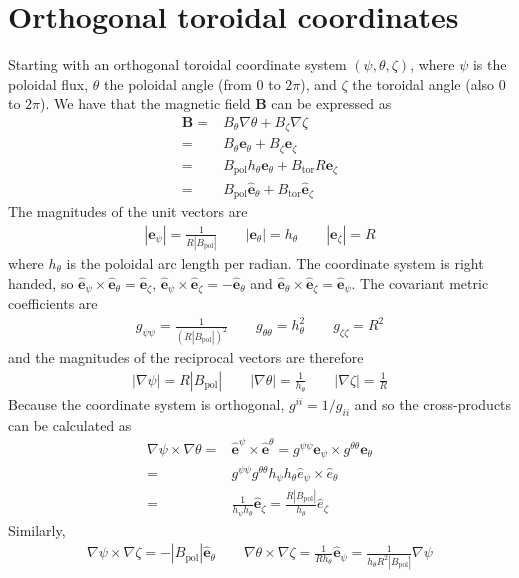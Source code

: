 \documentclass[12pt]{article}
\newcommand{\hthe}{\ensuremath{h_\theta}}
\newcommand{\Bp}{\ensuremath{B_{\text{pol}}}}
\newcommand{\Bt}{\ensuremath{B_{\text{tor}}}}
\newcommand{\ve}[1]{\ensuremath{\boldsymbol{#1}}}
\newcommand{\hv}[1]{\hat{\ve{#1}}}
\newcommand{\Bvec}{\ve{B}}
\begin{document}
\section{Orthogonal toroidal coordinates}
%
\label{sec:coordinates}
Starting with an orthogonal toroidal coordinate system $\left(\psi, \theta,
\zeta\right)$, where $\psi$ is the poloidal flux, $\theta$ the poloidal angle
(from $0$ to $2\pi$), and $\zeta$ the toroidal angle (also $0$ to $2\pi$). We
have that the magnetic field $\Bvec$ can be expressed as
%
\begin{align*}
 \Bvec =& B_\theta \nabla \theta + B_\zeta \nabla \zeta\\ =& B_\theta
    \ve{e}_\theta + B_\zeta \ve{e}_\zeta\\ =& \Bp h_\theta \ve{e}_\theta + \Bt
    R \ve{e}_\zeta\\ =& \Bp \hv{e}_\theta + \Bt \hv{e}_\zeta
\end{align*}
%
The magnitudes of the unit vectors are
%
\begin{align*}
\left|\ve{e}_\psi\right| = \frac{1}{R\left|\Bp\right|} \qquad
\left|\ve{e}_\theta\right| = \hthe \qquad \left|\ve{e}_\zeta\right| = R
\end{align*}
%
where $\hthe$ is the poloidal arc length per radian.  The coordinate system is
right handed, so $\hv{e}_\psi\times\hv{e}_\theta = \hv{e}_\zeta$,
$\hv{e}_\psi\times\hv{e}_\zeta = -\hv{e}_\theta$ and
$\hv{e}_\theta\times\hv{e}_\zeta = \hv{e}_\psi$. The covariant metric
coefficients are
%
\begin{align*}
g_{\psi\psi} = \frac{1}{\left(R\left|\Bp\right|\right)^2} \qquad
g_{\theta\theta} = h_\theta^2 \qquad g_{\zeta\zeta} = R^2
\end{align*}
%
and the magnitudes of the reciprocal vectors are therefore
%
\begin{align*}
\left|\nabla\psi\right| = R\left|\Bp\right| \qquad \left|\nabla\theta\right| =
\frac{1}{h_\theta} \qquad \left|\nabla\zeta\right| = \frac{1}{R}
\end{align*}
%
Because the coordinate system is orthogonal, $g^{ii} = 1/g_{ii}$ and so the
cross-products can be calculated as
%
\begin{align*}
\nabla\psi\times\nabla\theta = &\hv{e}^\psi\times \hv{e}^\theta =
    g^{\psi\psi}\ve{e}_\psi\times g^{\theta\theta}\ve{e}_\theta \nonumber \\ =
    & g^{\psi\psi}g^{\theta\theta}h_\psi h_\theta
    \hat{e}_\psi\times\hat{e}_\theta \nonumber \\ = &\frac{1}{h_\psi
h_\theta}\hv{e}_\zeta = \frac{R\left|\Bp\right|}{h_\theta}\hat{e}_\zeta
\end{align*}
%
Similarly,
%
\begin{align*}
\nabla\psi\times\nabla\zeta = -\left|\Bp\right|\hv{e}_\theta \qquad
\nabla\theta\times\nabla\zeta = \frac{1}{Rh_\theta}\hv{e}_\psi =
\frac{1}{h_\theta R^2\left|\Bp\right|}\nabla \psi
\end{align*}
%
\end{document}
